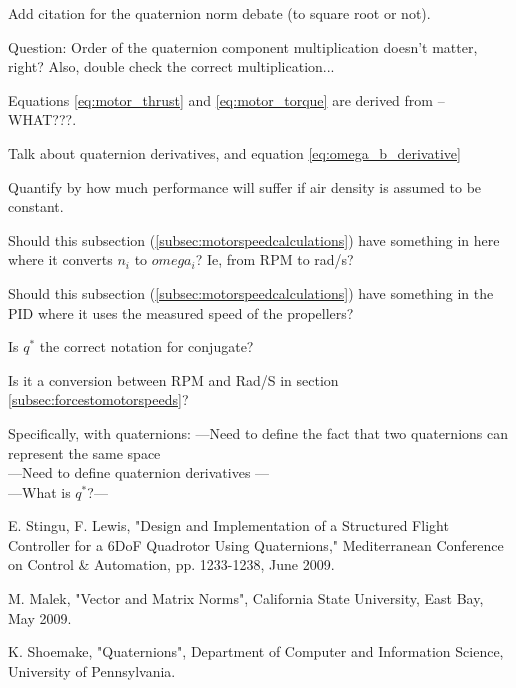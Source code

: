 \documentclass{article}
\numberwithin{equation}{section} %
\begin{document}
\begin{list}{*}{}
	\item Add citation for the quaternion norm debate (to square root or not).
	\item Question: Order of the quaternion component multiplication doesn't matter, right? Also, double check the correct multiplication...
	\item Equations \eqref{eq:motor_thrust} and \eqref{eq:motor_torque} are derived from --WHAT???.
	\item Talk about quaternion derivatives, and equation \eqref{eq:omega_b_derivative}
	\item Quantify by how much performance will suffer if air density is assumed to be constant.
	\item Should this subsection (\ref{subsec:motorspeedcalculations}) have something in here where it converts $n_i$ to $omega_i$? Ie, from RPM to rad/s?
	\item Should this subsection (\ref{subsec:motorspeedcalculations}) have something in the PID where it uses the measured speed of the propellers?
	\item  Is $q^*$ the correct notation for conjugate?
	\item Is it a conversion between RPM and Rad/S in section \ref{subsec:forcestomotorspeeds}?


\end{list}

Specifically, with quaternions:
---Need to define the fact that two quaternions can represent the same space \\
---Need to define quaternion derivatives --- \\
---What is $q^*$?--- \\



\begin{thebibliography}{99}


	E. Stingu, F. Lewis, 
	"Design and Implementation of a Structured Flight Controller for a 6DoF Quadrotor Using Quaternions," 
Mediterranean Conference on Control \& Automation, pp. 1233-1238, June 2009.


	M. Malek,
	"Vector and Matrix Norms", California State University, East Bay, May 2009.
	
	K. Shoemake,
	"Quaternions", Department of Computer and Information Science, University of Pennsylvania.
	
	
	
\end{thebibliography}
\end{document}
